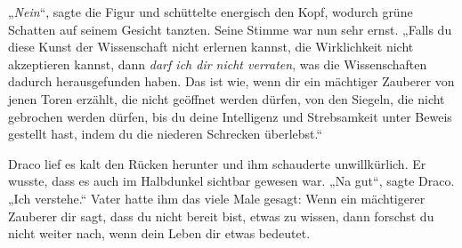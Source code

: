 „\emph{Nein}“, sagte die Figur und schüttelte energisch den Kopf, wodurch grüne Schatten auf seinem Gesicht tanzten. Seine Stimme war nun sehr ernst. „Falls du diese Kunst der Wissenschaft nicht erlernen kannst, die Wirklichkeit nicht akzeptieren kannst, dann \emph{darf ich dir nicht verraten}, was die Wissenschaften dadurch herausgefunden haben. Das ist wie, wenn dir ein mächtiger Zauberer von jenen Toren erzählt, die nicht geöffnet werden dürfen, von den Siegeln, die nicht gebrochen werden dürfen, bis du deine Intelligenz und Strebsamkeit unter Beweis gestellt hast, indem du die niederen Schrecken überlebst.“

Draco lief es kalt den Rücken herunter und ihm schauderte unwillkürlich. Er wusste, dass es auch im Halbdunkel sichtbar gewesen war. „Na gut“, sagte Draco. „Ich verstehe.“ Vater hatte ihm das viele Male gesagt: Wenn ein mächtigerer Zauberer dir sagt, dass du nicht bereit bist, etwas zu wissen, dann forschst du nicht weiter nach, wenn dein Leben dir etwas bedeutet.

